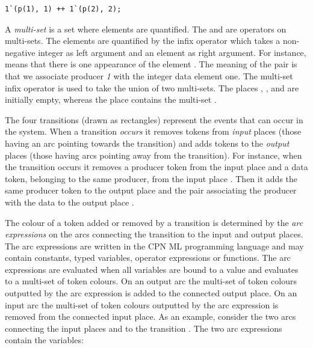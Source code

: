 \begin{verbatim}
1`(p(1), 1) ++ 1`(p(2), 2);
\end{verbatim}

\noindent
A \emph{multi-set} is a set where elements are quantified. The \code{++} and  are operators on multi-sets. The elements are quantified by the infix operator  which takes a non-negative integer as left argument and an element as right argument. For instance,  means that there is one appearance of the element . The meaning of the pair  is that we associate producer \emph{1} with the integer data element one. The multi-set infix operator \code{++} is used to take the union of two multi-sets. The places , ,   and   are initially empty, whereas the place  contains the multi-set .

The four transitions (drawn as rectangles) represent the events that can occur in the system. When a transition \emph{occurs} it removes tokens from \emph{input} places (those having an arc pointing towards the transition) and adds tokens to the \emph{output} places (those having arcs pointing away from the transition). For instance, when the transition  occurs it removes a producer token from the input place  and a data token, belonging to the same producer, from the input place . Then it adds the same producer token to the output place  and the pair associating the producer with the data to the output place . 

The colour of a token added or removed by a transition is determined by the \emph{arc expressions} on the arcs connecting the transition to the input and output places. The arc expressions are written in the CPN ML programming language and may contain constants, typed variables, operator expressions or functions. The arc expressions are evaluated when all variables are bound to a value and evaluates to a multi-set of token colours. On an output arc the multi-set of token colours outputted by the arc expression is added to the connected output place. On an input arc the multi-set of token colours outputted by the arc expression is removed from the connected input place. As an example, consider the two arcs connecting the input places  and  to the transition . The two arc expressions contain the variables: 


